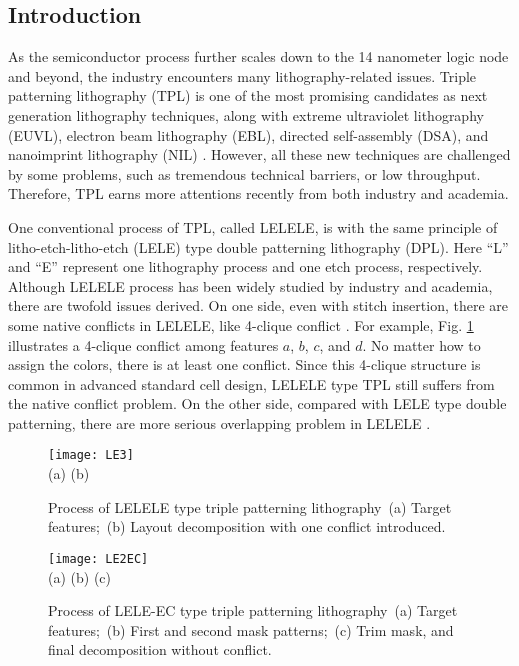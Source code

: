 \documentclass[12pt]{spieman}
\theoremstyle{plain}
\begin{document}
\begin{spacing}{1}   

\section{Introduction}
\label{sec:tplec_intro}


As the semiconductor process further scales down to the 14 nanometer logic node and beyond, the industry encounters many lithography-related issues.
Triple patterning lithography (TPL) \cite{TPL_SPIE2012_Lucas} is one of the most promising candidates as next generation lithography techniques,
along with extreme ultraviolet lithography (EUVL), electron beam lithography (EBL), directed self-assembly (DSA), and nanoimprint lithography (NIL)
\cite{LITH_TCAD2013_Pan,LITH_ICCAD2012_Yu}.
However, all these new techniques are challenged by some problems, such as tremendous technical barriers, or low throughput.
Therefore, TPL earns more attentions recently from both industry and academia.


One conventional process of TPL, called LELELE, is with the same principle of litho-etch-litho-etch (LELE) type double patterning lithography (DPL).
Here ``L'' and ``E'' represent one lithography process and one etch process, respectively.
Although LELELE process has been widely studied by industry and academia, there are twofold issues derived.
On one side, even with stitch insertion, there are some native conflicts in LELELE, like 4-clique conflict \cite{TPL_ICCAD2011_Yu}.
For example, Fig. \ref{fig:tplec_le3} illustrates a 4-clique conflict among features $a$, $b$, $c$, and $d$.
No matter how to assign the colors, there is at least one conflict.
Since this 4-clique structure is common in advanced standard cell design, LELELE type TPL still suffers from the native conflict problem.
On the other side, compared with LELE type double patterning, there are more serious overlapping problem in LELELE \cite{TPL_SPIE08_Ausschnitt}.

\begin{figure}[tb]
  \centering
  \texttt{[image: LE3]}
  \\ (a) \hspace{4.4cm} (b)
  \caption{Process of LELELE type triple patterning lithography~(a) Target features;~(b) Layout decomposition with one conflict introduced.}
  \label{fig:tplec_le3}
\end{figure}


\begin{figure}[tb]
  \centering
  \texttt{[image: LE2EC]}
  \\ (a) \hspace{3.8cm} (b) \hspace{3.8cm} (c)
  \caption{Process of LELE-EC type triple patterning lithography~(a) Target features;~(b) First and second mask patterns;~(c) Trim mask, and final decomposition without conflict.}
  \label{fig:tplec}
\end{figure}


\end{spacing}
\end{document}
